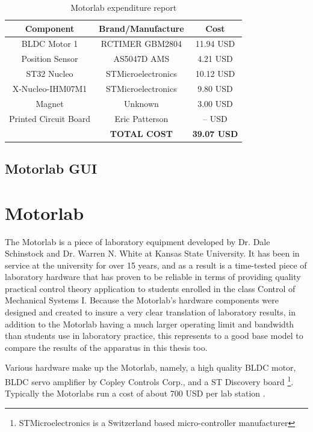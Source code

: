 \begin{table}[ht]
\begin{center}
\caption{Motorlab expenditure report}
\begin{tabular}[c]{|c|c|c|}

\hline
\textbf{Component} & \textbf{Brand/Manufacture} & \textbf{Cost} \\

\hline
BLDC Motor 1 & RCTIMER GBM2804 & 11.94 USD\\

\hline
Position Sensor & AS5047D AMS & 4.21 USD\\

\hline
ST32 Nucleo & STMicroelectronics & 10.12 USD\\

\hline
X-Nucleo-IHM07M1 & STMicroelectronics & 9.80 USD\\

\hline
Magnet & Unknown & 3.00 USD\\

\hline
Printed Circuit Board & Eric Patterson & -- USD\\

\hline
& \textbf{TOTAL COST} & \textbf{39.07 USD}\\
\hline
\end{tabular}

\label{table1}
\end{center}
\end{table}


\subsection{Motorlab GUI}
\label{makereference2.1.4} 

\section{Motorlab}
\label{makereference2.2} 

The Motorlab is a piece of laboratory equipment developed by Dr. Dale Schinstock and Dr. Warren N. White at Kansas State University. It has been in service at the university for over 15 years, and as a result is a time-tested piece of laboratory hardware that has proven to be reliable in terms of providing quality practical control theory application to students enrolled in the class Control of Mechanical Systems I. Because the Motorlab's hardware components were designed and created to insure a very clear translation of laboratory results, in addition to the Motorlab having a much larger operating limit and bandwidth than students use in laboratory practice, this represents to a good base model to compare the results of the apparatus in this thesis too.

Various hardware make up the Motorlab, namely, a high quality BLDC motor, BLDC servo amplifier by Copley Controls Corp., and a ST Discovery board \footnote{STMicroelectronics is a Switzerland based micro-controller manufacturer}. Typically the Motorlabs run a cost of about 700 USD per lab station \citep{4}.
